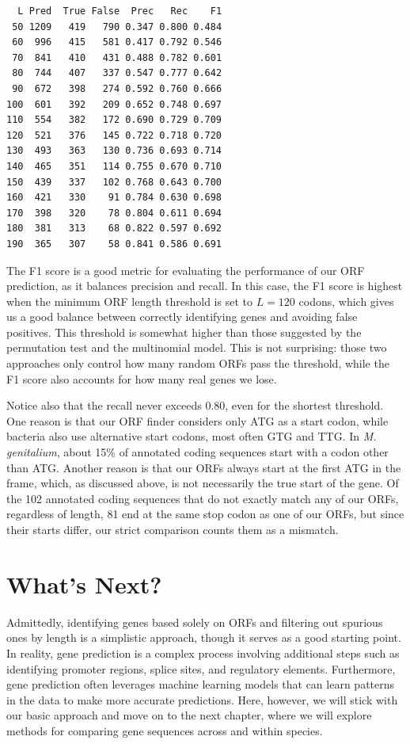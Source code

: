 \vspace*{3mm}
\begin{lstlisting}
  L Pred  True False  Prec   Rec    F1
 50 1209   419   790 0.347 0.800 0.484
 60  996   415   581 0.417 0.792 0.546
 70  841   410   431 0.488 0.782 0.601
 80  744   407   337 0.547 0.777 0.642
 90  672   398   274 0.592 0.760 0.666
100  601   392   209 0.652 0.748 0.697
110  554   382   172 0.690 0.729 0.709
120  521   376   145 0.722 0.718 0.720
130  493   363   130 0.736 0.693 0.714
140  465   351   114 0.755 0.670 0.710
150  439   337   102 0.768 0.643 0.700
160  421   330    91 0.784 0.630 0.698
170  398   320    78 0.804 0.611 0.694
180  381   313    68 0.822 0.597 0.692
190  365   307    58 0.841 0.586 0.691
\end{lstlisting}

The F1 score is a good metric for evaluating the performance of our ORF prediction, as it balances precision and recall. In this case, the F1 score is highest when the minimum ORF length threshold is set to $L=120$ codons, which gives us a good balance between correctly identifying genes and avoiding false positives. This threshold is somewhat higher than those suggested by the permutation test and the multinomial model. This is not surprising: those two approaches only control how many random ORFs pass the threshold, while the F1 score also accounts for how many real genes we lose.

Notice also that the recall never exceeds 0.80, even for the shortest threshold. One reason is that our ORF finder considers only ATG as a start codon, while bacteria also use alternative start codons, most often GTG and TTG. In {\em M. genitalium}, about 15\% of annotated coding sequences start with a codon other than ATG. Another reason is that our ORFs always start at the first ATG in the frame, which, as discussed above, is not necessarily the true start of the gene. Of the 102 annotated coding sequences that do not exactly match any of our ORFs, regardless of length, 81 end at the same stop codon as one of our ORFs, but since their starts differ, our strict comparison counts them as a mismatch.

\section{What's Next?}

Admittedly, identifying genes based solely on ORFs and filtering out spurious ones by length is a simplistic approach, though it serves as a good starting point. In reality, gene prediction is a complex process involving additional steps such as identifying promoter regions, splice sites, and regulatory elements. Furthermore, gene prediction often leverages machine learning models that can learn patterns in the data to make more accurate predictions. Here, however, we will stick with our basic approach and move on to the next chapter, where we will explore methods for comparing gene sequences across and within species.
